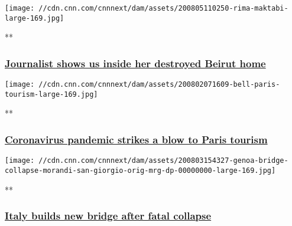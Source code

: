 \href{/videos/world/2020/08/05/rima-maktabi-journalist-home-destroyed-beirut-explosion-ctw-vpx.cnn/video/playlists/around-the-world/}{}

\texttt{[image: //cdn.cnn.com/cnnnext/dam/assets/200805110250-rima-maktabi-large-169.jpg]}

**

\hypertarget{journalist-shows-us-inside-her-destroyed-beirut-home}{%
\subsubsection{\texorpdfstring{\href{/videos/world/2020/08/05/rima-maktabi-journalist-home-destroyed-beirut-explosion-ctw-vpx.cnn/video/playlists/around-the-world/}{Journalist
shows us inside her destroyed Beirut
home}}{Journalist shows us inside her destroyed Beirut home}}\label{journalist-shows-us-inside-her-destroyed-beirut-home}}

\href{/videos/travel/2020/08/02/paris-france-tourism-coronavirus-bell-pkg-vpx.cnn/video/playlists/around-the-world/}{}

\texttt{[image: //cdn.cnn.com/cnnnext/dam/assets/200802071609-bell-paris-tourism-large-169.jpg]}

**

\hypertarget{coronavirus-pandemic-strikes-a-blow-to-paris-tourism}{%
\subsubsection{\texorpdfstring{\href{/videos/travel/2020/08/02/paris-france-tourism-coronavirus-bell-pkg-vpx.cnn/video/playlists/around-the-world/}{Coronavirus
pandemic strikes a blow to Paris
tourism}}{Coronavirus pandemic strikes a blow to Paris tourism}}\label{coronavirus-pandemic-strikes-a-blow-to-paris-tourism}}

\href{/videos/world/2020/08/03/genoa-bridge-collapse-morandi-san-giorgio-orig-mrg-dp.cnn/video/playlists/around-the-world/}{}

\texttt{[image: //cdn.cnn.com/cnnnext/dam/assets/200803154327-genoa-bridge-collapse-morandi-san-giorgio-orig-mrg-dp-00000000-large-169.jpg]}

**

\hypertarget{italy-builds-new-bridge-after-fatal-collapse}{%
\subsubsection{\texorpdfstring{\href{/videos/world/2020/08/03/genoa-bridge-collapse-morandi-san-giorgio-orig-mrg-dp.cnn/video/playlists/around-the-world/}{Italy
builds new bridge after fatal
collapse}}{Italy builds new bridge after fatal collapse}}\label{italy-builds-new-bridge-after-fatal-collapse}}

